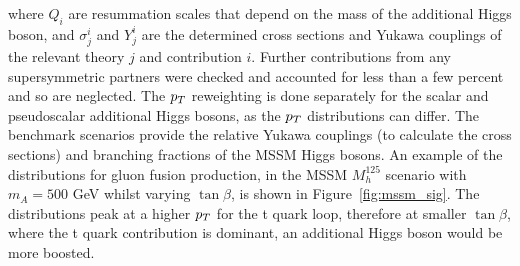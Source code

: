 where $Q_i$ are resummation scales that depend on the mass of the additional Higgs boson, and $\sigma^{i}_{j}$ and $Y^{i}_{j}$ are the determined cross sections and Yukawa couplings of the relevant theory $j$ and contribution $i$.
Further contributions from any supersymmetric partners were checked and accounted for less than a few percent and so are neglected.
The $p_{T}$ reweighting is done separately for the scalar and pseudoscalar additional Higgs bosons, as the $p_{T}$ distributions can differ.
The benchmark scenarios provide the relative Yukawa couplings (to calculate the cross sections) and branching fractions of the \ac{MSSM} Higgs bosons.
An example of the distributions for gluon fusion production, in the \ac{MSSM} $M_{h}^{125}$ scenario with $m_{A} = 500$ GeV whilst varying $\tan\beta$, is shown in Figure~\ref{fig:mssm_sig}.
The distributions peak at a higher $p_{T}$ for the t quark loop, therefore at smaller $\tan\beta$, where the t quark contribution is dominant, an additional Higgs boson would be more boosted. \\

